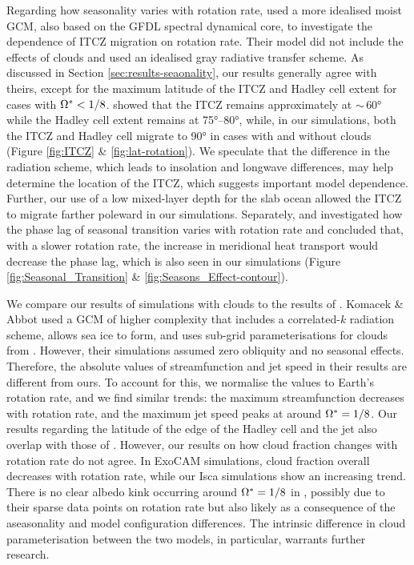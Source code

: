 Regarding how seasonality varies with rotation rate, \cite{faulk2017-Effects} used a more idealised moist GCM, also based on the GFDL spectral dynamical core, to investigate the dependence of ITCZ migration on rotation rate. Their model did not include the effects of clouds and used an idealised gray radiative transfer scheme. As discussed in Section \ref{sec:results-seaonality}, our results generally agree with theirs, except for the maximum latitude of the ITCZ and Hadley cell extent for cases with $\Omega^*<1/8$. \cite{faulk2017-Effects} showed that the ITCZ remains approximately at $\sim\,$\ang{60} while the Hadley cell extent remains at \ang{75}--\ang{80}, while, in our simulations, both the ITCZ and Hadley cell migrate to \ang{90} in cases with and without clouds (Figure \ref{fig:ITCZ} \& \ref{fig:lat-rotation}). We speculate that the difference in the radiation scheme, which leads to insolation and longwave differences, may help determine the location of the ITCZ, which suggests important model dependence. Further, our use of a low mixed-layer depth for the slab ocean allowed the ITCZ to migrate farther poleward in our simulations. Separately, \cite{guendelman2022-Key} and \cite{tan2022-Weak} investigated how the phase lag of seasonal transition varies with rotation rate and concluded that, with a slower rotation rate, the increase in meridional heat transport would decrease the phase lag, which is also seen in our simulations (Figure \ref{fig:Seasonal_Transition} \& \ref{fig:Seasons_Effect-contour}).

We compare our results of simulations with clouds to the results of \citet{komacek2019-Atmospheric}. Komacek \& Abbot used a GCM of higher complexity \citep[ExoCAM;][]{wolf2022-ExoCAM} that includes a correlated-$k$ radiation scheme, allows sea ice to form, and uses sub-grid parameterisations for clouds from \cite{rasch1998-Comparison}. However, their simulations assumed zero obliquity and no seasonal effects. Therefore, the absolute values of streamfunction and jet speed in their results are different from ours. To account for this, we normalise the values to Earth's rotation rate, and we find similar trends: the maximum streamfunction decreases with rotation rate, and the maximum jet speed peaks at around $\Omega^*=1/8$. Our results regarding the latitude of the edge of the Hadley cell and the jet also overlap with those of \citet{komacek2019-Atmospheric}. However, our results on how cloud fraction changes with rotation rate do not agree. In ExoCAM simulations, cloud fraction overall decreases with rotation rate, while our Isca simulations show an increasing trend. There is no clear albedo kink occurring around $\Omega^*=1/8$ in \citet{komacek2019-Atmospheric}, possibly due to their sparse data points on rotation rate but also likely as a consequence of the aseasonality and model configuration differences. The intrinsic difference in cloud parameterisation between the two models, in particular, warrants further research. 

